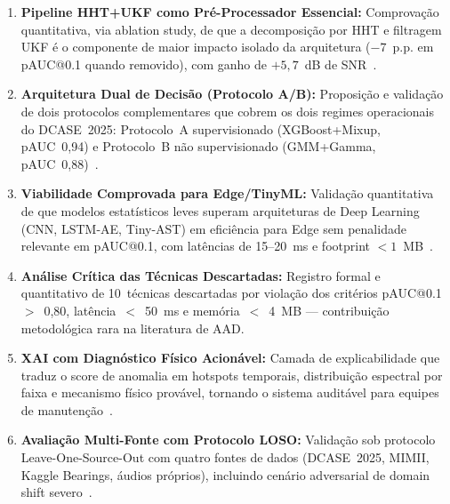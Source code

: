 \begin{enumerate}
    \item \textbf{Pipeline HHT+UKF como Pré-Processador Essencial:} Comprovação
    quantitativa, via ablation study, de que a decomposição por HHT e filtragem UKF é o
    componente de maior impacto isolado da arquitetura ($-7$~p.p. em pAUC@0.1 quando removido),
    com ganho de $+5{,}7$~dB de SNR~\cite{Zamorano2025}.

    \item \textbf{Arquitetura Dual de Decisão (Protocolo A/B):} Proposição e validação de
    dois protocolos complementares que cobrem os dois regimes operacionais do DCASE~2025:
    Protocolo~A supervisionado (XGBoost+Mixup, pAUC~0,94) e Protocolo~B não supervisionado
    (GMM+Gamma, pAUC~0,88)~\cite{Emon2025, Jiang2025}.

    \item \textbf{Viabilidade Comprovada para Edge/TinyML:} Validação quantitativa de que
    modelos estatísticos leves superam arquiteturas de Deep Learning (CNN, LSTM-AE, Tiny-AST)
    em eficiência para Edge sem penalidade relevante em pAUC@0.1, com latências de 15--20~ms
    e footprint $<1$~MB~\cite{Khamaisi2025}.

    \item \textbf{Análise Crítica das Técnicas Descartadas:} Registro formal e
    quantitativo de 10~técnicas descartadas por violação dos critérios pAUC@0.1~$>$~0,80,
    latência~$<$~50~ms e memória~$<$~4~MB --- contribuição metodológica rara na literatura
    de AAD.

    \item \textbf{XAI com Diagnóstico Físico Acionável:} Camada de explicabilidade que
    traduz o score de anomalia em hotspots temporais, distribuição espectral por faixa e
    mecanismo físico provável, tornando o sistema auditável para equipes de
    manutenção~\cite{Ali2025}.

    \item \textbf{Avaliação Multi-Fonte com Protocolo LOSO:} Validação sob protocolo
    Leave-One-Source-Out com quatro fontes de dados (DCASE~2025, MIMII, Kaggle Bearings,
    áudios próprios), incluindo cenário adversarial de domain shift severo~\cite{Harada2023}.
\end{enumerate}

\color{black}

